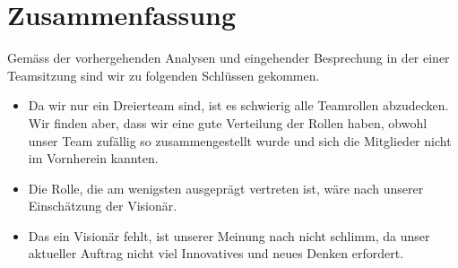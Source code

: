 
\chapter{Zusammenfassung}

Gemäss der vorhergehenden Analysen und eingehender Besprechung in der einer Teamsitzung sind wir zu folgenden Schlüssen gekommen.
\begin{itemize}
\item Da wir nur ein Dreierteam sind, ist es schwierig alle Teamrollen abzudecken. Wir finden aber, dass wir eine gute Verteilung der Rollen haben, obwohl unser Team zufällig so zusammengestellt wurde und sich die Mitglieder nicht im Vornherein kannten.
\item Die Rolle, die am wenigsten ausgeprägt vertreten ist, wäre nach unserer Einschätzung der Visionär. 
\item Das ein Visionär fehlt, ist unserer Meinung nach nicht schlimm, da unser aktueller Auftrag nicht viel Innovatives und neues Denken erfordert.
\end{itemize}